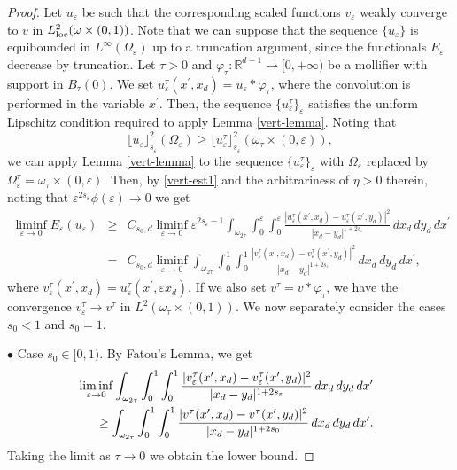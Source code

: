 \documentclass[11pt]{article}
\def\e{\varepsilon}
\begin{document}
\begin{proof}
Let $u_\e$ be such that the corresponding scaled functions $v_\e$ weakly converge to $v$ in $L^2_{
\rm loc}(\omega\times (0,1))$. 
Note that we can suppose that the sequence $\{u_\e\}$ is equibounded in $L^\infty(\Omega_\e)$ up to a truncation argument, since the functionals $E_\e$ decrease by truncation. 
Let $\tau>0$ and $\varphi_\tau\colon\mathbb R^{d-1}\to [0,+\infty)$ be a mollifier with support in $B_\tau(0)$. 
We set $u_\e^\tau(x^\prime,x_d)=u_\e \ast\varphi_\tau$, where the convolution is performed in the variable $x^\prime$. Then, the sequence $\{u_\e^\tau\}_\e$ satisfies the uniform Lipschitz condition required to apply Lemma \ref{vert-lemma}. Noting that 
$$\lfloor u_\e\rfloor_{s_\e}^2(\Omega_\e)\geq \lfloor u_\e^\tau\rfloor_{s_\e}^2(\omega_\tau\times(0,\e)),$$ 
we can apply Lemma \ref{vert-lemma} to the sequence $\{u_\e^\tau\}_\e$ with $\Omega_\e$ replaced by $\Omega_\e^\tau=\omega_{\tau}\times (0,\e)$. Then, by \eqref{vert-est1} and the arbitrariness of $\eta>0$ therein, noting that $\e^{2s_\e}\phi(\e)\to 0$ we get 
\begin{eqnarray*}
\liminf_{\e\to 0} E_\e(u_\e)&\geq&C_{s_0,d} \liminf_{\e\to 0}\e^{2s_\e-1}\int_{\omega_{2\tau}}\int_0^\e\int_0^\e\frac{|u^\tau_\e(x^\prime, x_d)-u^\tau_\e(x^\prime, y_d)|^2}{|x_d-y_d|^{1+2s_\e}}\, dx_d\, dy_d\, dx^\prime\\
&=&C_{s_0,d} \liminf_{\e\to 0}\int_{\omega_{2\tau}}\int_0^1\int_0^1\frac{|v^\tau_\e(x^\prime, x_d)-v^\tau_\e(x^\prime, y_d)|^2}{|x_d-y_d|^{1+2s_\e}}\, dx_d\, dy_d\, dx^\prime, 
\end{eqnarray*}
where $v^\tau_\e(x^\prime, x_d)=u^\tau_\e(x^\prime, \e x_d)$. 
If we also set $v^\tau=v\ast \varphi_\tau$, we have the convergence $v^\tau_\e\to v^\tau$ in $L^2(\omega_\tau\times (0,1))$. 
We now separately consider the cases $s_0<1$ and $s_0=1$. 

\smallskip 

$\bullet$ {Case $s_0\in[0,1)$.} By Fatou's Lemma, we get 
\begin{eqnarray*}
&&\hspace{-2cm}\liminf_{\e\to 0}\int_{\omega_{2\tau}}\int_0^1\int_0^1\frac{|v^\tau_\e(x^\prime, x_d)-v^\tau_\e(x^\prime, y_d)|^2}{|x_d-y_d|^{1+2s_\e}}\, dx_d\, dy_d\, dx^\prime\\
&&\geq 
\int_{\omega_{2\tau}}\int_0^1\int_0^1\frac{|v^\tau(x^\prime, x_d)-v^\tau(x^\prime, y_d)|^2}{|x_d-y_d|^{1+2s_0}}\, dx_d\, dy_d\, dx^\prime. 
\end{eqnarray*}
Taking the limit as $\tau\to 0$ we obtain the lower bound. 


\end{proof}
\end{document}

